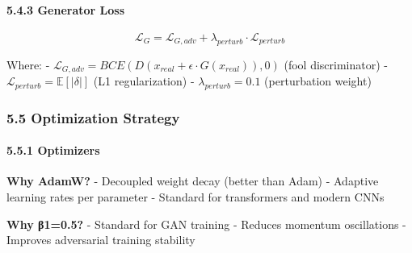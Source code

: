 \paragraph{5.4.3 Generator Loss}\label{generator-loss}

\[\mathcal{L}_G = \mathcal{L}_{G,adv} + \lambda_{perturb} \cdot \mathcal{L}_{perturb}\]

Where: -
\(\mathcal{L}_{G,adv} = BCE(D(x_{real} + \epsilon \cdot G(x_{real})), 0)\)
(fool discriminator) - \(\mathcal{L}_{perturb} = \mathbb{E}[|\delta|]\)
(L1 regularization) - \(\lambda_{perturb} = 0.1\) (perturbation weight)

\subsubsection{5.5 Optimization Strategy}\label{optimization-strategy}

\paragraph{5.5.1 Optimizers}\label{optimizers}

\begin{Shaded}
\begin{Highlighting}[]
\OperatorTok{=}
\OperatorTok{=}\NormalTok{,}
\OperatorTok{=}\NormalTok{(}\NormalTok{, }\NormalTok{),    }
\OperatorTok{=}
\NormalTok{)}

\OperatorTok{=}
\OperatorTok{=}\NormalTok{,               }
\OperatorTok{=}\NormalTok{(}\NormalTok{, }\NormalTok{),}
\OperatorTok{=}
\NormalTok{)}
\end{Highlighting}
\end{Shaded}

\textbf{Why AdamW?} - Decoupled weight decay (better than Adam) -
Adaptive learning rates per parameter - Standard for transformers and
modern CNNs

\textbf{Why β1=0.5?} - Standard for GAN training - Reduces momentum
oscillations - Improves adversarial training stability

